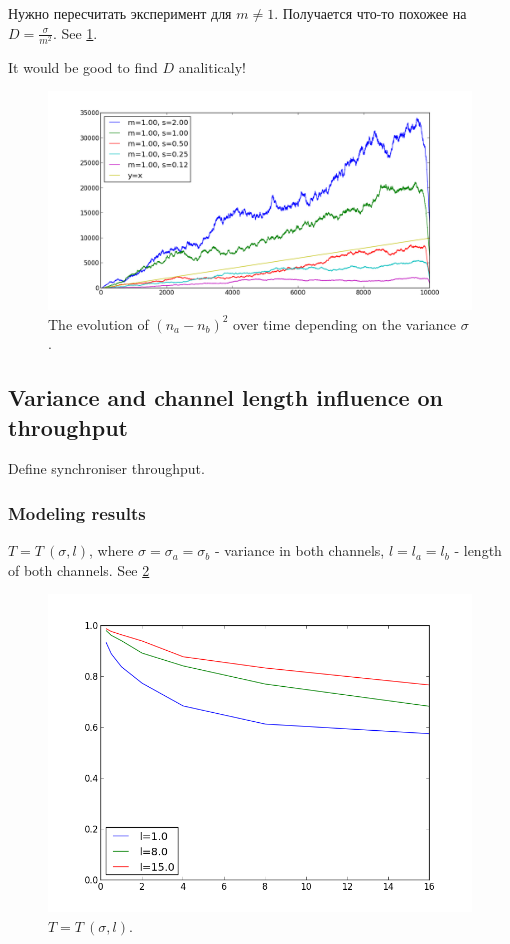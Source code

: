 Нужно пересчитать эксперимент для $m \neq 1$. Получается что-то похожее на $D = \frac{\sigma}{m^{2}}$. See \ref{fig:brownian}.

It would be good to find $D$ analiticaly!
  \begin{figure}[here]
  \centering
  \includegraphics[scale=0.4]{figs/all.png}
  \caption{The evolution of $(n_{a} - n_{b})^{2}$ over time depending on the variance $\sigma$.}
  \label{fig:brownian}
  \end{figure}

  \subsection{Variance and channel length influence on throughput}
Define synchroniser throughput.
    \subsubsection{Modeling results}
$T = T \: (\sigma, l)$, where $\sigma = \sigma_{a} = \sigma_{b}$ - variance in both channels, $l = l_{a} = l_{b}$ - length of both channels. See \ref{fig:t_s}
    \begin{figure}[here]
    \centering
    \includegraphics[scale=0.4]{figs/thr_(disp,l).png}
    \caption{$T = T \: (\sigma, l)$.}
    \label{fig:t_s}
    \end{figure}

